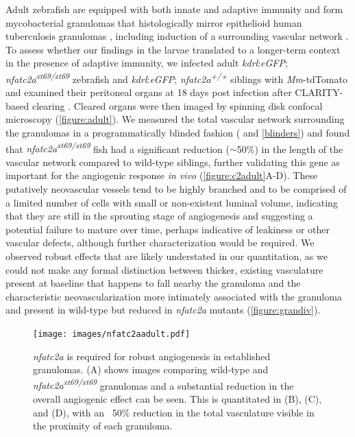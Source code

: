 Adult zebrafish are equipped with both innate and adaptive immunity and form mycobacterial granulomas that histologically mirror epithelioid human tuberculosis granulomas \citep{Swaim2006}, including induction of a surrounding vascular network \citep{Cronan2015}. To assess whether our findings in the larvae translated to a longer\hyp{}term context in the presence of adaptive immunity, we infected adult \textit{kdrl}:\textit{eGFP}; \textit{nfatc2a\textsuperscript{xt69/xt69}} zebrafish and \textit{kdrl}:\textit{eGFP}; \textit{nfatc2a\textsuperscript{+/+}} siblings with \textit{Mm}\hyp{}tdTomato and examined their peritoneal organs at 18 days post infection after CLARITY\hyp{}based clearing \citep{Chung2013, Cronan2015}. Cleared organs were then imaged by spinning disk confocal microscopy (\autoref{figure:adult}). We measured the total vascular network surrounding the granulomas in a programmatically blinded fashion (\citet{Salter2016} and \autoref{blinders}) and found that \textit{nfatc2a\textsuperscript{xt69/xt69}} fish had a significant reduction (${\sim}$50\%) in the length of the vascular network compared to wild\hyp{}type siblings, further validating this gene as important for the angiogenic response \textit{in vivo} (\autoref{figure:c2adult}A\hyp{}D). These putatively neovascular vessels tend to be highly branched and to be comprised of a limited number of cells with small or non\hyp{}existent luminal volume, indicating that they are still in the sprouting stage of angiogenesis and suggesting a potential failure to mature over time, perhaps indicative of leakiness or other vascular defects, although further characterization would be required. We observed robust effects that are likely understated in our quantitation, as we could not make any formal distinction between thicker, existing vasculature present at baseline that happens to fall nearby the granuloma and the characteristic neovascularization more intimately associated with the granuloma and present in wild\hyp{}type but reduced in \textit{nfatc2a} mutants (\autoref{figure:grandiv}).

\begin{figure}
\centering
\texttt{[image: images/nfatc2aadult.pdf]}
\caption{\textit{nfatc2a} is required for robust angiogenesis in established granulomas. (A) shows images comparing wild\hyp{}type and \textit{nfatc2a\textsuperscript{xt69/xt69}} granulomas and a substantial reduction in the overall angiogenic effect can be seen. This is quantitated in (B), (C), and (D), with an ~50\% reduction in the total vasculature visible in the proximity of each granuloma.}
\label{figure:c2adult}
\end{figure}

